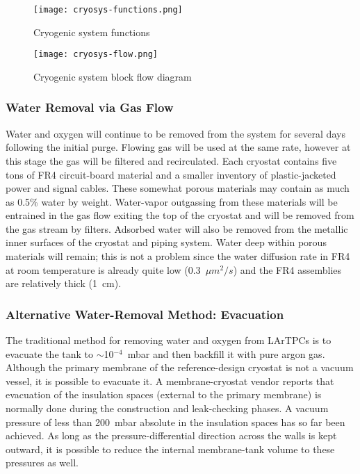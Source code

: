 \begin{figure}[htbp]
\centering
\texttt{[image: cryosys-functions.png]} 
\caption{Cryogenic system functions}
\label{fig:v5ch2-LAr-FD-block-diagram-2014}
\end{figure}

\begin{figure}[htbp]
\centering
\texttt{[image: cryosys-flow.png]} 
\caption{Cryogenic system block flow diagram}
\label{fig:v5ch2-LAr-FD-cryo-process-2014}
\end{figure}



\subsubsection{Water Removal via Gas Flow}

Water and oxygen will continue to be removed from the system for several days following the
initial purge. Flowing gas will be used at the same rate, however at this stage the gas will
be filtered and recirculated. Each cryostat contains five tons of FR4
circuit-board material and a
smaller inventory of plastic-jacketed power and signal cables. These somewhat porous
materials may contain as much as 0.5\% water by weight. Water-vapor outgassing from these
materials will be entrained in the gas flow exiting
the top of the cryostat and will be removed
from the gas stream by filters. Adsorbed water will also be removed from the metallic inner
surfaces of the cryostat and piping system. Water deep within porous materials will remain;
this is not a problem since
the water diffusion rate in FR4 at room temperature is already quite low (0.3~$\mu m^2 /s$) and the FR4 assemblies are relatively thick (1~cm).

\subsubsection{Alternative Water-Removal Method: Evacuation}

The traditional method for removing water and oxygen from LArTPCs is to evacuate the tank to $\sim$10$^{-4}$~mbar  and then backfill it with pure argon gas. Although the primary membrane of the reference-design cryostat is not a vacuum vessel, it is possible to evacuate it.  A membrane-cryostat vendor reports that evacuation of  the insulation spaces (external to the primary membrane) is normally done during the construction and leak-checking phases.  A vacuum pressure of less than 200~mbar absolute in the insulation spaces has so far been achieved.  As long as the pressure-differential direction across the walls is kept outward, it is possible to reduce the internal membrane-tank volume to these pressures as well.  

